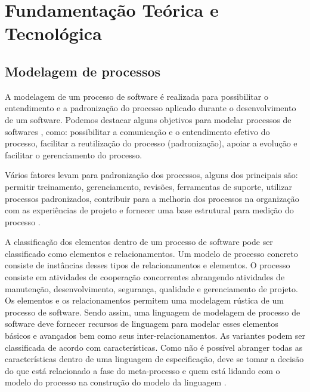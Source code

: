 \section{Fundamentação Teórica e Tecnológica}\label{fundamentacaoTeorica}

\subsection{Modelagem de processos}
A modelagem de um processo de software é realizada para possibilitar o entendimento e a padronização do processo aplicado durante o desenvolvimento de um software. Podemos destacar alguns objetivos para modelar processos de softwares \cite{genvigir2003modelagem}, como: possibilitar a comunicação e o entendimento efetivo do processo, facilitar a reutilização do processo (padronização), apoiar a evolução e facilitar o gerenciamento do processo.


Vários fatores levam para padronização dos processos, alguns dos principais são: permitir treinamento, gerenciamento, revisões, ferramentas de suporte, utilizar processos padronizados, contribuir para a melhoria dos processos na organização com as experiências de projeto e fornecer uma base estrutural para medição do processo \cite{genvigir2003modelagem}.


A classificação dos elementos dentro de um processo de software pode ser classificado como elementos e relacionamentos. Um modelo de processo concreto consiste de instâncias desses tipos de relacionamentos e elementos. O processo consiste em atividades de cooperação concorrentes abrangendo atividades de manutenção, desenvolvimento, segurança, qualidade e gerenciamento de projeto. Os elementos e os relacionamentos permitem uma modelagem rústica de um processo de software. Sendo assim, uma linguagem de modelagem de processo de software deve fornecer recursos de linguagem para modelar esses elementos básicos e avançados bem como seus inter-relacionamentos. As variantes podem ser classificada de acordo com características. Como não é possível abranger todas as características dentro de uma linguagem de especificação, deve se tomar a decisão do que está relacionado a fase do meta-processo e quem está lidando com o modelo do processo na construção do modelo da linguagem \cite{genvigir2003modelagem}.


